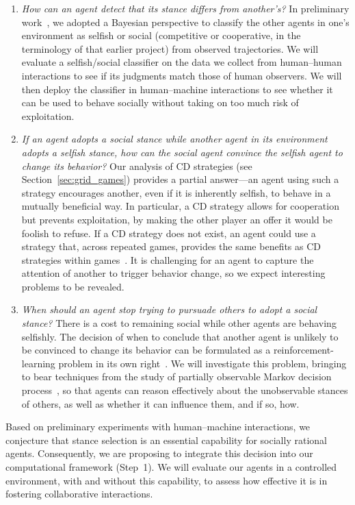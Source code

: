 \begin{enumerate}

\item \emph{How can an agent detect that its stance differs from another's?}
  In preliminary work~\cite{kleiman16}, we adopted a Bayesian
  perspective to classify the other agents in one's environment as
  selfish or social (competitive or cooperative, in the terminology of
  that earlier project) from observed trajectories. We will evaluate a
  selfish/social classifier on the data we collect from human--human
  interactions to see if its judgments match those of human
  observers. We will then deploy the classifier in human--machine
  interactions to see whether it can be used to behave socially
  without taking on too much risk of exploitation.
  
\item \emph{If an agent adopts a social stance while another agent in 
  its environment adopts a selfish stance, how can the social agent
  convince the selfish agent to change its behavior?}  Our analysis of
  CD strategies (see Section~\ref{sec:grid_games}) provides a partial
  answer---an agent using such a strategy encourages another, even if
  it is inherently selfish, to behave in a mutually beneficial way.
  In particular, a CD strategy allows for cooperation but prevents
  exploitation, by making the other player an offer it would be
  foolish to refuse.  If a CD strategy does not exist, an agent could
  use a strategy that, across repeated games, provides the same
  benefits as CD strategies within games~\cite{munoz08}. It is
  challenging for an agent to capture the attention of another to
  trigger behavior change, so we expect interesting problems to be
  revealed.

\item \emph{When should an agent stop trying to pursuade others to
  adopt a social stance?}  There is a cost to remaining social while
  other agents are behaving selfishly.  The decision of when to
  conclude that another agent is unlikely to be convinced to change
  its behavior can be formulated as a reinforcement-learning problem
  in its own right~\cite{boutilier1996planning}.  We will investigate
  this problem, bringing to bear techniques from the study of
  partially observable Markov decision process~\cite{kaelbling98}, so
  that agents can reason effectively about the unobservable stances of
  others, as well as whether it can influence them, and if so, how.
  
\end{enumerate}

Based on preliminary experiments with human--machine interactions, we
conjecture that stance selection is an essential capability for
socially rational agents.  Consequently, we are proposing to integrate
this decision into our computational framework (Step~1).  We will
evaluate our agents in a controlled environment, with and without this
capability, to assess how effective it is in fostering collaborative
interactions.
